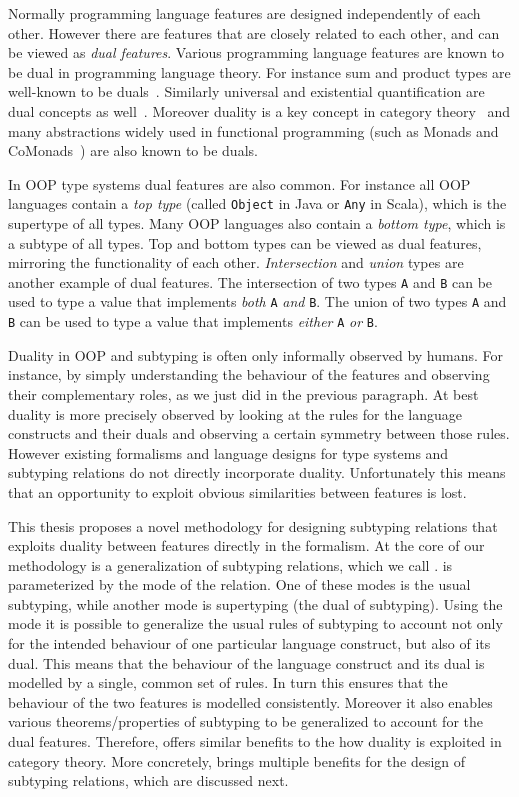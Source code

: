 Normally programming language features are designed independently of each
other. However there are features that are closely
related to each other, and can be viewed as \emph{dual features}.
Various programming language features are known to be dual 
in programming language theory. 
For instance sum and product types are well-known 
to be duals~\citep{BirddeMoor96:Algebra}.
Similarly universal and existential quantification are dual concepts
as well~\citep{barwise1981generalized}. 
Moreover duality is a key concept in category theory~\citep{MacLane:cwm} and 
many abstractions widely used in functional programming (such as Monads and
CoMonads~\citep{uustalu2008comonadic}) are also known to be duals.

In OOP type systems dual features are also common. 
For instance all OOP languages contain a \emph{top type} (called \verb|Object| in
Java or \verb|Any| in Scala), which is the supertype of all types. 
Many OOP languages also contain a \emph{bottom type}, which is a subtype of
all types. Top and bottom types can be viewed as dual features, 
mirroring the functionality of each other. 
\emph{Intersection} and \emph{union}
types are another example of dual features. The intersection of two
types \verb|A| and \verb|B| can be used to type a value that
implements \emph{both} \verb|A| \emph{and} \verb|B|. The union of two types 
\verb|A| and \verb|B| can be used to type a value that
implements \emph{either} \verb|A| \emph{or} \verb|B|.
  
Duality in OOP and subtyping is often only informally observed by humans. For instance,
by simply understanding the behaviour of the features and observing their
complementary roles, as we just did in the previous paragraph.
At best duality is more precisely observed by
looking at the rules for the language constructs and their duals and
observing a certain symmetry between those rules. However existing formalisms
and language designs for type systems and subtyping relations
do not directly incorporate duality. Unfortunately
this means that an opportunity to exploit obvious similarities
between features is lost. 

This thesis proposes a novel methodology for designing subtyping
relations that exploits duality between features directly in the formalism.
At the core of our
methodology is a generalization of subtyping relations, which we call
\emph{\nameduo}.  \nameduo is parameterized by the mode of the
relation. One of these modes is the usual subtyping, while another
mode is supertyping (the dual of subtyping). Using the mode it is possible
to generalize the usual rules of subtyping to account not only for the
intended behaviour of one particular language construct, but also of its
dual. This means that the behaviour of the language construct and its dual
is modelled by a single, common set of rules. In turn this ensures that
the behaviour of the two features is modelled consistently. Moreover
it also enables various theorems/properties of subtyping to be
generalized to account for the dual features. Therefore, \nameduo offers
similar benefits to the how duality is exploited in category theory.
More concretely, \nameduo brings multiple benefits for the design
of subtyping relations, which are discussed next.

